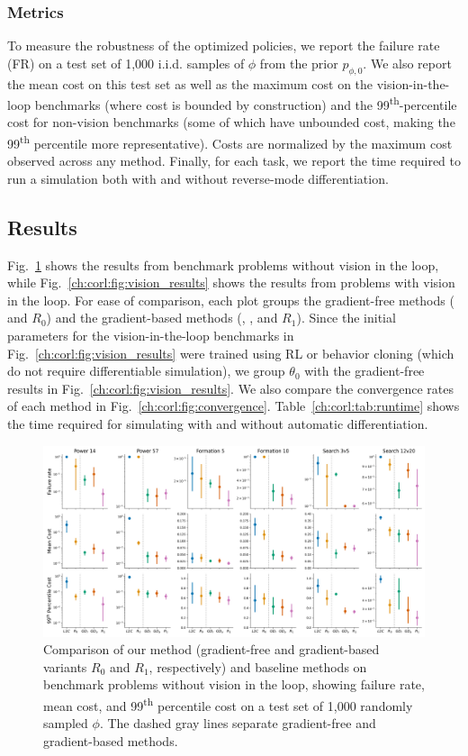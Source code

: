 \subsubsection{Metrics}

To measure the robustness of the optimized policies, we report the failure rate (FR) on a test set of 1,000 i.i.d. samples of $\phi$ from the prior $p_{\phi, 0}$. We also report the mean cost on this test set as well as the maximum cost on the vision-in-the-loop benchmarks (where cost is bounded by construction) and the 99\textsuperscript{th}-percentile cost for non-vision benchmarks (some of which have unbounded cost, making the 99\textsuperscript{th} percentile more representative). Costs are normalized by the maximum cost observed across any method. Finally, for each task, we report the time required to run a simulation both with and without reverse-mode differentiation.

\subsection{Results}

Fig.~\ref{ch:corl:fig:nonvision_results} shows the results from benchmark problems without vision in the loop, while Fig.~\ref{ch:corl:fig:vision_results} shows the results from problems with vision in the loop. For ease of comparison, each plot groups the gradient-free methods (\ltc{} and $R_0$) and the gradient-based methods (\gdr, \gda, and $R_1$). Since the initial parameters for the vision-in-the-loop benchmarks in Fig.~\ref{ch:corl:fig:vision_results} were trained using RL or behavior cloning (which do not require differentiable simulation), we group $\theta_0$ with the gradient-free results in Fig.~\ref{ch:corl:fig:vision_results}. We also compare the convergence rates of each method in Fig.~\ref{ch:corl:fig:convergence}. Table~\ref{ch:corl:tab:runtime} shows the time required for simulating with and without automatic differentiation.

\begin{figure}[tb]
    \centering
    \includegraphics[width=\linewidth]{images/corl/nonvision.png}
    \caption{Comparison of our method (gradient-free and gradient-based variants $R_0$ and $R_1$, respectively) and baseline methods on benchmark problems without vision in the loop, showing failure rate, mean cost, and 99\textsuperscript{th} percentile cost on a test set of 1,000 randomly sampled $\phi$. The dashed gray lines separate gradient-free and gradient-based methods.}\label{ch:corl:fig:nonvision_results}
\end{figure}

